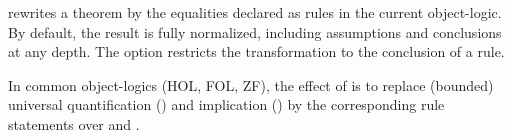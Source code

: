 \begin{isabellebody}
\begin{isamarkuptext}
\begin{description}
  \item \hyperlink{attribute.rule-format}{\mbox{}} rewrites a theorem by the equalities
  declared as \hyperlink{attribute.rulify}{\mbox{}} rules in the current object-logic.
  By default, the result is fully normalized, including assumptions
  and conclusions at any depth.  The  option
  restricts the transformation to the conclusion of a rule.

  In common object-logics (HOL, FOL, ZF), the effect of \hyperlink{attribute.rule-format}{\mbox{}} is to replace (bounded) universal quantification
  () and implication () by the corresponding
  rule statements over  and .

  \end{description}%
\end{isamarkuptext}%
\isamarkuptrue%
%
\isadelimtheory
%
\endisadelimtheory
%
\isatagtheory
{}\isamarkupfalse%
%
\endisatagtheory
{\isafoldtheory}%
%
\isadelimtheory
%
\endisadelimtheory
\isanewline
\end{isabellebody}%
